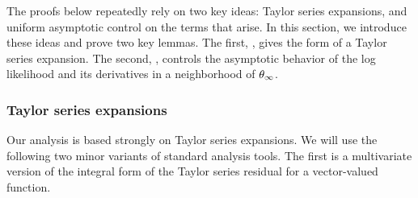 The proofs below repeatedly rely on two key ideas: Taylor series
expansions, and uniform asymptotic control on the terms that arise.
In this section, we introduce these ideas and prove two key
lemmas.  The first, , gives the form
of a Taylor series expansion.  The second, ,
controls the asymptotic behavior of the log likelihood
and its derivatives in a neighborhood of $\theta_{\infty}$.




\subsubsection{Taylor series expansions}

Our analysis is based strongly on Taylor series expansions.
We will use the following two minor variants of standard analysis tools.
The first is a multivariate version of the integral form of the Taylor series
residual for a vector-valued function.

